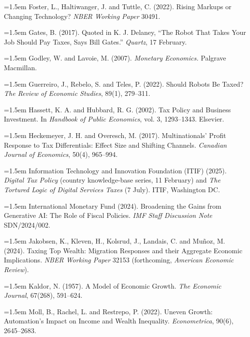 \documentclass[12pt]{article}
\begin{document}
\hangindent=1.5em Foster, L., Haltiwanger, J. and Tuttle, C. (2022). Rising Markups or Changing Technology? \textit{NBER Working Paper} 30491.\par\addvspace{0.45em}
\hangindent=1.5em Gates, B. (2017). Quoted in K. J. Delaney, ``The Robot That Takes Your Job Should Pay Taxes, Says Bill Gates.'' \textit{Quartz}, 17 February.\par\addvspace{0.45em}
\hangindent=1.5em Godley, W. and Lavoie, M. (2007). \textit{Monetary Economics.} Palgrave Macmillan.\par\addvspace{0.45em}
\hangindent=1.5em Guerreiro, J., Rebelo, S. and Teles, P. (2022). Should Robots Be Taxed? \textit{The Review of Economic Studies}, 89(1), 279--311.\par\addvspace{0.45em}
\hangindent=1.5em Hassett, K. A. and Hubbard, R. G. (2002). Tax Policy and Business Investment. In \textit{Handbook of Public Economics}, vol. 3, 1293--1343. Elsevier.\par\addvspace{0.45em}
\hangindent=1.5em Heckemeyer, J. H. and Overesch, M. (2017). Multinationals' Profit Response to Tax Differentials: Effect Size and Shifting Channels. \textit{Canadian Journal of Economics}, 50(4), 965--994.\par\addvspace{0.45em}
\hangindent=1.5em Information Technology and Innovation Foundation (ITIF) (2025). \textit{Digital Tax Policy} (country knowledge-base series, 11 February) and \textit{The Tortured Logic of Digital Services Taxes} (7 July). ITIF, Washington DC.\par\addvspace{0.45em}
\hangindent=1.5em International Monetary Fund (2024). Broadening the Gains from Generative AI: The Role of Fiscal Policies. \textit{IMF Staff Discussion Note} SDN/2024/002.\par\addvspace{0.45em}
\hangindent=1.5em Jakobsen, K., Kleven, H., Kolsrud, J., Landais, C. and Muñoz, M. (2024). Taxing Top Wealth: Migration Responses and their Aggregate Economic Implications. \textit{NBER Working Paper} 32153 (forthcoming, \textit{American Economic Review}).\par\addvspace{0.45em}
\hangindent=1.5em Kaldor, N. (1957). A Model of Economic Growth. \textit{The Economic Journal}, 67(268), 591--624.\par\addvspace{0.45em}
\hangindent=1.5em Moll, B., Rachel, L. and Restrepo, P. (2022). Uneven Growth: Automation's Impact on Income and Wealth Inequality. \textit{Econometrica}, 90(6), 2645--2683.\par\addvspace{0.45em}
\end{document}
